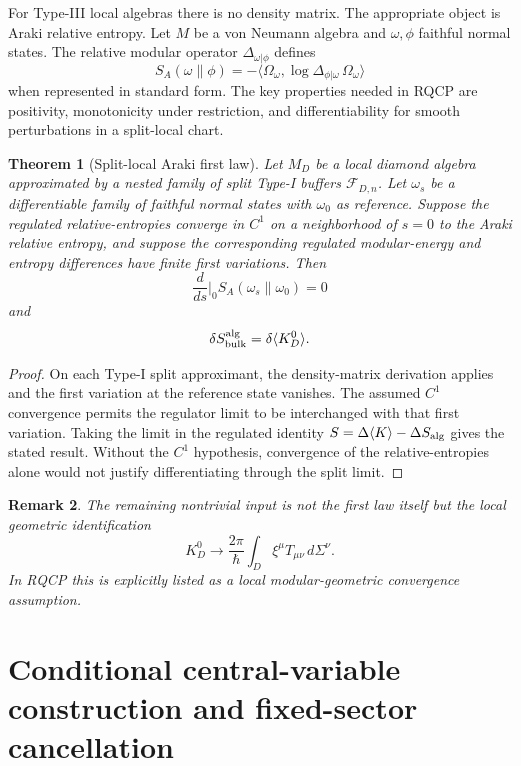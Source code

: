 \documentclass[11pt]{article}
\newtheorem{theorem}{Theorem}[section]
\newtheorem{remark}[theorem]{Remark}
\newcommand{\F}{\mathcal F}
\begin{document}
For Type-III local algebras there is no density matrix.  The appropriate object is Araki relative entropy.  Let $M$ be a von Neumann algebra and $\omega,\phi$ faithful normal states.  The relative modular operator $\Delta_{\omega|\phi}$ defines
\[
S_A(\omega\|\phi)=-\langle\Omega_\omega,\log\Delta_{\phi|\omega}\,\Omega_\omega\rangle
\]
when represented in standard form.  The key properties needed in RQCP are positivity, monotonicity under restriction, and differentiability for smooth perturbations in a split-local chart.

\begin{theorem}[Split-local Araki first law]\label{thm:arakifirstlaw}
Let $M_D$ be a local diamond algebra approximated by a nested family of
split Type-I buffers $\F_{D,n}$.  Let $\omega_s$ be a differentiable family
of faithful normal states with $\omega_0$ as reference.  Suppose the
regulated relative-entropies converge in \(C^1\) on a neighborhood of
\(s=0\) to the Araki relative entropy, and suppose the corresponding
regulated modular-energy and entropy differences have finite first
variations.  Then
\[
\frac{d}{ds}\bigg|_0 S_A(\omega_s\|\omega_0)=0
\]
and
\[
\delta S_{\rm bulk}^{\rm alg}=\delta\langle K_D^0\rangle.
\]
\end{theorem}

\begin{proof}
On each Type-I split approximant, the density-matrix derivation applies and
the first variation at the reference state vanishes.  The assumed \(C^1\)
convergence permits the regulator limit to be interchanged with that first
variation.  Taking the limit in the regulated identity
\(S=\Delta\langle K\rangle-\Delta S_{\rm alg}\) gives the stated result.
Without the \(C^1\) hypothesis, convergence of the relative-entropies alone
would not justify differentiating through the split limit.
\end{proof}

\begin{remark}
The remaining nontrivial input is not the first law itself but the local geometric identification
\[
K_D^0\longrightarrow \frac{2\pi}{\hbar}\int_D\xi^\mu T_{\mu\nu}\,d\Sigma^\nu.
\]
In RQCP this is explicitly listed as a local modular-geometric convergence assumption.
\end{remark}

\section{Conditional central-variable construction and fixed-sector
cancellation}\label{app:sequestering}
\end{document}
